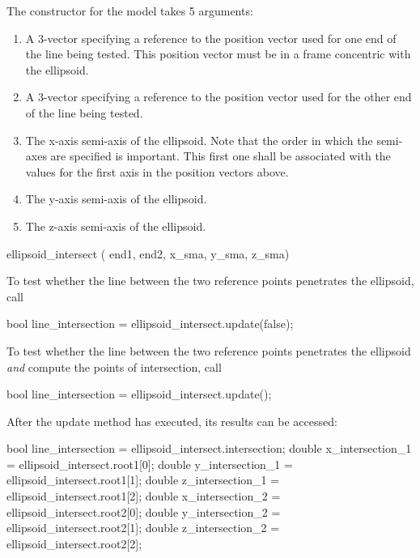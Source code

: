 \documentclass[11pt,fleqn]{report}
\begin{document}
The constructor for the model takes 5 arguments:
\begin{enumerate}
\item A 3-vector specifying a reference to the position vector used for one
end of the line being tested. This position vector must be in a frame
concentric with the ellipsoid.
\item A 3-vector specifying a reference to the position vector used for the
other end of the line being tested.
\item The x-axis semi-axis of the ellipsoid. Note that the order in which
the semi-axes are specified is important. This first one shall be associated
with the values for the first axis in the position vectors above.
\item The y-axis semi-axis of the ellipsoid.
\item The z-axis semi-axis of the ellipsoid.
\end{enumerate}

\begin{code}
ellipsoid_intersect ( end1,
end2,
x_sma,
y_sma,
z_sma)
\end{code}

To test whether the line between the two reference points penetrates the
ellipsoid, call
\begin{code}
bool line_intersection = ellipsoid_intersect.update(false);
\end{code}

To test whether the line between the two reference points penetrates the
ellipsoid \textit{and} compute the points of intersection, call
\begin{code}
bool line_intersection = ellipsoid_intersect.update();
\end{code}

After the update method has executed, its results can be accessed:
\begin{code}
bool line_intersection = ellipsoid_intersect.intersection;
double x_intersection_1 = ellipsoid_intersect.root1[0];
double y_intersection_1 = ellipsoid_intersect.root1[1];
double z_intersection_1 = ellipsoid_intersect.root1[2];
double x_intersection_2 = ellipsoid_intersect.root2[0];
double y_intersection_2 = ellipsoid_intersect.root2[1];
double z_intersection_2 = ellipsoid_intersect.root2[2];
\end{code}


\end{document}
